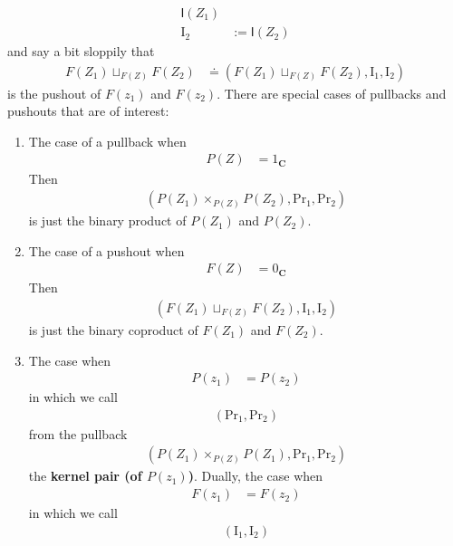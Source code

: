 \begin{exa}
\begin{enumerate}
\begin{align*}
  \mathsf{I}(Z_{1})
  \\
  \mathrm{I}_{2}
  &:=
  \mathsf{I}(Z_{2})
\end{align*}
and say a bit sloppily that
\begin{align*}
  F(Z_{1})
  \sqcup_{F(Z)}
  F(Z_{2})
  &\doteq
  \left(
    F(Z_{1})
    \sqcup_{F(Z)}
    F(Z_{2}),
    \mathrm{I}_{1},
    \mathrm{I}_{2}
  \right)
\end{align*}
is the pushout of $F(z_{1})$ and $F(z_{2})$.
There are special cases of pullbacks and pushouts that are of interest:
\begin{enumerate}
\item[(a)]
The case of a pullback when
\begin{align*}
  P(Z)
  &=
  1_{\mathbf{C}}
\end{align*}
Then
\begin{align*}
  \left(
    P(Z_{1})
    \times_{P(Z)}
    P(Z_{2}),
    \mathrm{Pr}_{1},
    \mathrm{Pr}_{2}
  \right)
\end{align*}
is just the binary product of $P(Z_{1})$ and $P(Z_{2})$.
\item[(b)]
The case of a pushout when
\begin{align*}
  F(Z)
  &=
  0_{\mathbf{C}}
\end{align*}
Then
\begin{align*}
  \left(
    F(Z_{1})
    \sqcup_{F(Z)}
    F(Z_{2}),
    \mathrm{I}_{1},
    \mathrm{I}_{2}
  \right)
\end{align*}
is just the binary coproduct of $F(Z_{1})$ and $F(Z_{2})$.
\item[(c)]
The case when
\begin{align*}
  P(z_{1})
  &=
  P(z_{2})
\end{align*}
in which we call
\begin{align*}
  \left(
    \mathrm{Pr}_{1},
    \mathrm{Pr}_{2}
  \right)
\end{align*}
from the pullback
\begin{align*}
  \left(
    P(Z_{1})
    \times_{P(Z)}
    P(Z_{1}),
    \mathrm{Pr}_{1},
    \mathrm{Pr}_{2}
  \right)
\end{align*}
the \textbf{kernel pair (of $P(z_{1})$)}.
Dually, the case when
\begin{align*}
  F(z_{1})
  &=
  F(z_{2})
\end{align*}
in which we call
\begin{align*}
  \left(
    \mathrm{I}_{1},
    \mathrm{I}_{2}
  \right)
\end{align*}

\end{enumerate}
\end{enumerate}
\end{exa}
